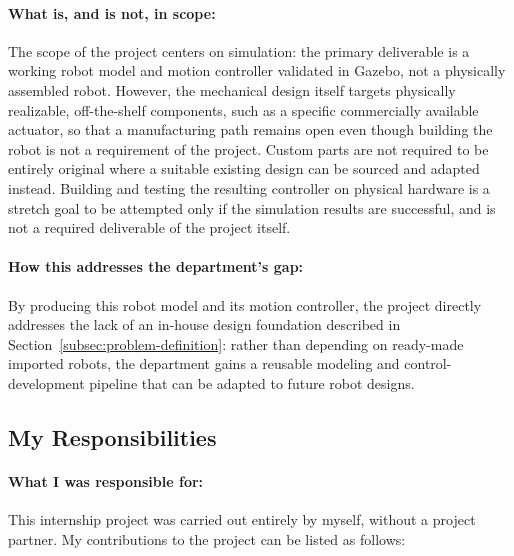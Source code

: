 \documentclass[12pt]{article}
\begin{document}
\paragraph{What is, and is not, in scope:} The scope of the project centers on simulation: the primary deliverable is a working robot model and motion controller validated in Gazebo, not a physically assembled robot. However, the mechanical design itself targets physically realizable, off-the-shelf components, such as a specific commercially available actuator, so that a manufacturing path remains open even though building the robot is not a requirement of the project. Custom parts are not required to be entirely original where a suitable existing design can be sourced and adapted instead. Building and testing the resulting controller on physical hardware is a stretch goal to be attempted only if the simulation results are successful, and is not a required deliverable of the project itself.
\paragraph{How this addresses the department's gap:} By producing this robot model and its motion controller, the project directly addresses the lack of an in-house design foundation described in Section~\ref{subsec:problem-definition}: rather than depending on ready-made imported robots, the department gains a reusable modeling and control-development pipeline that can be adapted to future robot designs.

\subsection{My Responsibilities}
\label{subsec:responsibilities}
\paragraph{What I was responsible for:} This internship project was carried out entirely by myself, without a project partner. My contributions to the project can be listed as follows:
\end{document}
